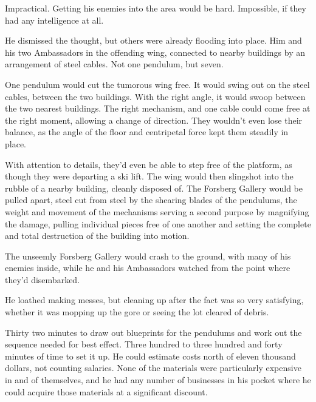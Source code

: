 Impractical.  Getting his enemies into the area would be hard.  Impossible, if they had any intelligence at all.



He dismissed the thought, but others were already flooding into place.  Him and his two Ambassadors in the offending wing, connected to nearby buildings by an arrangement of steel cables.  Not one pendulum, but seven.



One pendulum would cut the tumorous wing free.  It would swing out on the steel cables, between the two buildings.  With the right angle, it would swoop between the two nearest buildings.  The right mechanism, and one cable could come free at the right moment, allowing a change of direction.  They wouldn't even lose their balance, as the angle of the floor and centripetal force kept them steadily in place.



With attention to details, they'd even be able to step free of the platform, as though they were departing a ski lift.  The wing would then slingshot into the rubble of a nearby building, cleanly disposed of.  The Forsberg Gallery would be pulled apart, steel cut from steel by the shearing blades of the pendulums, the weight and movement of the mechanisms serving a second purpose by magnifying the damage, pulling individual pieces free of one another and setting the complete and total destruction of the building into motion.



The unseemly Forsberg Gallery would crash to the ground, with many of his enemies inside, while he and his Ambassadors watched from the point where they'd disembarked.



He loathed making messes, but cleaning up after the fact was so very satisfying, whether it was mopping up the gore or seeing the lot cleared of debris.



Thirty two minutes to draw out blueprints for the pendulums and work out the sequence needed for best effect.  Three hundred to three hundred and forty minutes of time to set it up.  He could estimate costs north of eleven thousand dollars, not counting salaries.  None of the materials were particularly expensive in and of themselves, and he had any number of businesses in his pocket where he could acquire those materials at a significant discount.



